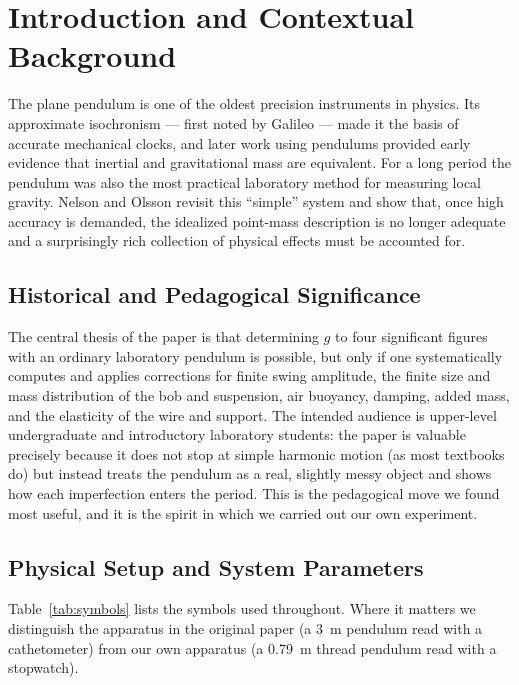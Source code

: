 \documentclass[11pt]{article}
\begin{document}
\tableofcontents
\bigskip

\section{Introduction and Contextual Background}

The plane pendulum is one of the oldest precision instruments in physics. Its
approximate isochronism --- first noted by Galileo --- made it the basis of accurate
mechanical clocks, and later work using pendulums provided early evidence that inertial
and gravitational mass are equivalent. For a long period the pendulum was also the most
practical laboratory method for measuring local gravity. Nelson and Olsson revisit this
``simple'' system and show that, once high accuracy is demanded, the idealized
point-mass description is no longer adequate and a surprisingly rich collection of
physical effects must be accounted for.

\subsection{Historical and Pedagogical Significance}

The central thesis of the paper is that determining $g$ to four significant figures with
an ordinary laboratory pendulum is possible, but only if one systematically computes and
applies corrections for finite swing amplitude, the finite size and mass distribution of
the bob and suspension, air buoyancy, damping, added mass, and the elasticity of the
wire and support. The intended audience is upper-level undergraduate and introductory
laboratory students: the paper is valuable precisely because it does not stop at simple
harmonic motion (as most textbooks do) but instead treats the pendulum as a real, slightly
messy object and shows how each imperfection enters the period. This is the pedagogical
move we found most useful, and it is the spirit in which we carried out our own experiment.

\subsection{Physical Setup and System Parameters}

Table~\ref{tab:symbols} lists the symbols used throughout. Where it matters we distinguish
the apparatus in the original paper (a \SI{3}{m} pendulum read with a cathetometer) from
our own apparatus (a \SI{0.79}{m} thread pendulum read with a stopwatch).
\end{document}
